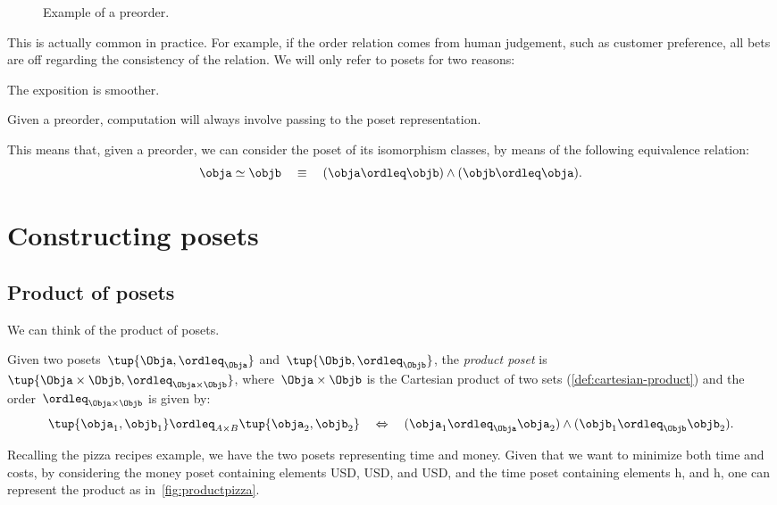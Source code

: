 \begin{figure}[tbh]
  \begin{center}
  \end{center}
  \caption{Example of a preorder. \label{fig:preorder}}
\end{figure}

This is actually common in practice. For example, if the order relation comes from human judgement, such as customer preference, all bets are off regarding the consistency of the relation. We will only refer to posets for two reasons:
\begin{compactenum}
  \item The exposition is smoother.
  \item Given a preorder, computation will always involve passing to the poset representation.
\end{compactenum}
This means that, given a preorder, we can consider the poset of its isomorphism classes, by means of the following equivalence relation:
\begin{equation}
  \obja \simeq \objb \quad \equiv \quad (\obja \ordleq \objb) \wedge (\objb \ordleq \obja).
\end{equation}

\section{Constructing posets}

\subsection{Product of posets}
We can think of the product of posets.

\begin{definition}
  \label{def:productposet}
  Given two posets~$\tup{\Obja, \ordleq_{\Obja}}$
  and~$\tup{\Objb, \ordleq_{\Objb}}$, the \emph{product poset} is~$\tup{\Obja \times \Objb, \ordleq_{\Obja\times \Objb}}$, where~$\Obja \times \Objb$ is the Cartesian product of two sets (\cref{def:cartesian-product}) and the order~$\ordleq_{\Obja \times \Objb}$ is given by:
  \begin{equation}
    \tup{\obja_1, \objb_1}
    \ordleq_{A\times B}
    \tup{\obja_2, \objb_2}
    \quad
    \Leftrightarrow
    \quad
    (\obja_1 \ordleq_\Obja \obja_2) \wedge
    (\objb_1 \ordleq_\Objb \objb_2).
  \end{equation}
\end{definition}
Recalling the pizza recipes example, we have the two posets representing time and money. Given that we want to minimize both time and costs, by considering the money poset containing elements \unit[1]{USD}, \unit[2]{USD}, and \unit[3]{USD}, and the time poset containing elements \unit[1]{h}, and \unit[2]{h}, one can represent the product as in~\cref{fig:productpizza}.

